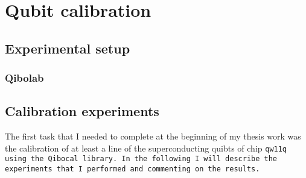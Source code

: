 \chapter{Qubit calibration}

\section{Experimental setup}

\subsection{Qibolab}

\section{Calibration experiments}

The first task that I needed to complete at the beginning of my thesis work was the calibration of at least a line of the superconducting quibts of chip \tt{qw11q} using the \tt{Qibocal} library.
In the following I will describe the experiments that I performed and commenting on the results.


